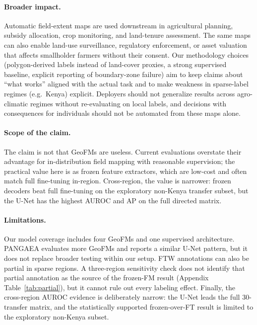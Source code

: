 \documentclass{article}
\begin{document}
\paragraph{Broader impact.} Automatic field-extent maps are used downstream in
agricultural planning, subsidy allocation, crop monitoring, and land-tenure
assessment. The same maps can also enable land-use surveillance, regulatory
enforcement, or asset valuation that affects smallholder farmers without their
consent. Our methodology choices (polygon-derived labels instead of land-cover proxies, a
strong supervised baseline, explicit reporting of boundary-zone failure) aim to
keep claims about ``what works'' aligned with the actual task and to make weakness
in sparse-label regimes (e.g.\ Kenya) explicit. Deployers should
not generalize results across agro-climatic regimes without re-evaluating on
local labels, and decisions with consequences for individuals should not be
automated from these maps alone.

\paragraph{Scope of the claim.} The claim is not that GeoFMs are useless. Current
evaluations overstate their advantage for in-distribution field mapping with
reasonable supervision; the practical value here is as frozen feature extractors,
which are low-cost and often match full fine-tuning in-region. Cross-region, the
value is narrower: frozen decoders beat full fine-tuning on the exploratory non-Kenya transfer
subset, but the U-Net has the highest AUROC and AP on the full directed matrix.

\paragraph{Limitations.} Our model coverage includes four GeoFMs and one supervised
architecture. PANGAEA evaluates more GeoFMs and reports a similar U-Net pattern, but
it does not replace broader testing within our setup. FTW annotations can also be
partial in sparse regions. A three-region sensitivity check does not identify that
partial annotation as the source of the frozen-FM result (Appendix Table~\ref{tab:partial}), but it cannot
rule out every labeling effect. Finally, the cross-region AUROC evidence is deliberately
narrow: the U-Net leads the full 30-transfer matrix, and the statistically supported
frozen-over-FT result is limited to the exploratory non-Kenya subset.
\end{document}
